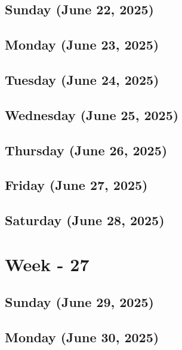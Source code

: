 \subsection*{Sunday (June 22, 2025)}
\subsection*{Monday (June 23, 2025)}
\subsection*{Tuesday (June 24, 2025)}
\subsection*{Wednesday (June 25, 2025)}
\subsection*{Thursday (June 26, 2025)}
\subsection*{Friday (June 27, 2025)}
\subsection*{Saturday (June 28, 2025)}

\section{Week - 27}
\subsection*{Sunday (June 29, 2025)}
\subsection*{Monday (June 30, 2025)}

\newpage
\begin{spacing}{1.0}
\renewcommand{\bibname}{\bf{References}}


\end{spacing}